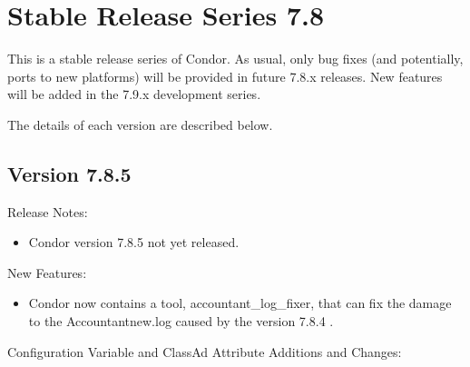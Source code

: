 
\section{\label{sec:History-7-8}Stable Release Series 7.8}

This is a stable release series of Condor.
As usual, only bug fixes (and potentially, ports to new platforms)
will be provided in future 7.8.x releases.
New features will be added in the 7.9.x development series.

The details of each version are described below.

\subsection*{\label{sec:New-7-8-5}Version 7.8.5}

\noindent Release Notes:

\begin{itemize}

\item Condor version 7.8.5 not yet released.

\end{itemize}


\noindent New Features:

\begin{itemize}

\item Condor now contains a tool, accountant_log_fixer, that can fix the
damage to the Accountantnew.log caused by the version 7.8.4 .

\end{itemize}

\noindent Configuration Variable and ClassAd Attribute Additions and Changes:

